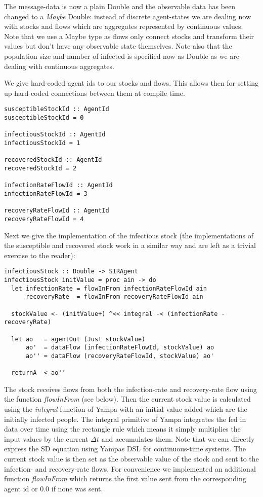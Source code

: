 The message-data is now a plain Double and the observable data has been changed to a \textit{Maybe} Double: instead of discrete agent-states we are dealing now with stocks and flows which are aggregates represented by continuous values. Note that we use a Maybe type as flows only connect stocks and transform their values but don't have any observable state themselves. Note also that the population size and number of infected is specified now as Double as we are dealing with continuous aggregates.

We give hard-coded agent ids to our stocks and flows. This allows then for setting up hard-coded connections between them at compile time.
\begin{verbatim}
susceptibleStockId :: AgentId
susceptibleStockId = 0

infectiousStockId :: AgentId
infectiousStockId = 1

recoveredStockId :: AgentId
recoveredStockId = 2

infectionRateFlowId :: AgentId
infectionRateFlowId = 3

recoveryRateFlowId :: AgentId
recoveryRateFlowId = 4
\end{verbatim}

Next we give the implementation of the infectious stock (the implementations of the susceptible and recovered stock work in a similar way and are left as a trivial exercise to the reader):

\begin{verbatim}
infectiousStock :: Double -> SIRAgent
infectiousStock initValue = proc ain -> do
  let infectionRate = flowInFrom infectionRateFlowId ain
      recoveryRate  = flowInFrom recoveryRateFlowId ain

  stockValue <- (initValue+) ^<< integral -< (infectionRate - recoveryRate)
  
  let ao   = agentOut (Just stockValue)
      ao'  = dataFlow (infectionRateFlowId, stockValue) ao
      ao'' = dataFlow (recoveryRateFlowId, stockValue) ao'
      
  returnA -< ao''
\end{verbatim}

The stock receives flows from both the infection-rate and recovery-rate flow using the function \textit{flowInFrom} (see below). Then the current stock value is calculated using the \textit{integral} function of Yampa with an initial value added which are the initially infected people. The integral primitive of Yampa integrates the fed in data over time using the rectangle rule which means it simply multiplies the input values by the current $\Delta t$ and accumulates them. Note that we can directly express the SD equation using Yampas DSL for continuous-time systems. The current stock value is then set as the observable value of the stock and sent to the infection- and recovery-rate flows. For convenience we implemented an additional function \textit{flowInFrom} which returns the first value sent from the corresponding agent id or 0.0 if none was sent.

